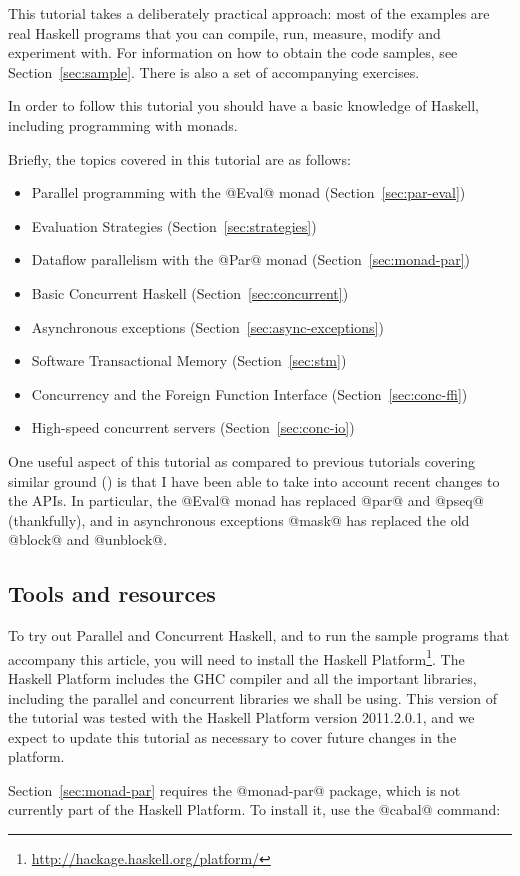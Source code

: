 \documentclass{llncs}
\let\cite=\citep
\newcommand{\Subsection}[2]{\subsection{#2}\label{sec:#1}}
\newcommand{\secref}[1]{Section~\ref{sec:#1}}
\begin{document}
This tutorial takes a deliberately practical approach: most of the
examples are real Haskell programs that you can compile, run, measure,
modify and experiment with.  For information on how to obtain the code
samples, see \secref{sample}.  There is also a set of accompanying
exercises.

In order to follow this tutorial you should have a basic knowledge of
Haskell, including programming with monads.

Briefly, the topics covered in this tutorial are as follows:

\begin{itemize}
\item Parallel programming with the @Eval@ monad (\secref{par-eval})
\item Evaluation Strategies (\secref{strategies})
\item Dataflow parallelism with the @Par@ monad (\secref{monad-par})
\item Basic Concurrent Haskell (\secref{concurrent})
\item Asynchronous exceptions (\secref{async-exceptions})
\item Software Transactional Memory (\secref{stm})
\item Concurrency and the Foreign Function Interface (\secref{conc-ffi})
\item High-speed concurrent servers (\secref{conc-io})
\end{itemize}

One useful aspect of this tutorial as compared to previous tutorials
covering similar ground (\cite{awkward,pjsingh-tutorial}) is that I have been
able to take into account recent changes to the APIs.  In particular,
the @Eval@ monad has replaced @par@ and @pseq@ (thankfully), and in
asynchronous exceptions @mask@ has replaced the old @block@ and
@unblock@.

\Subsection{tools}{Tools and resources}

To try out Parallel and Concurrent Haskell, and to run the sample
programs that accompany this article, you will need to install the
Haskell Platform\footnote{\url{http://hackage.haskell.org/platform/}}.
The Haskell Platform includes the GHC compiler and all the important
libraries, including the parallel and concurrent libraries we shall be
using.  This version of the tutorial was tested with the Haskell
Platform version 2011.2.0.1, and we expect to update this tutorial as
necessary to cover future changes in the platform.

\secref{monad-par} requires the @monad-par@ package, which is not
currently part of the Haskell Platform.  To install it, use the
@cabal@ command:
\end{document}

